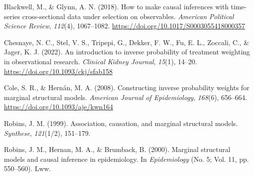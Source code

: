 \documentclass[
  letterpaper,
  DIV=11,
  numbers=noendperiod]{scrartcl}
\newlength{\cslhangindent}
\newenvironment{CSLReferences}[2] %
 {\begin{list}{}{%
  \setlength{\itemindent}{0pt}
  \setlength{\leftmargin}{0pt}
  \setlength{\parsep}{0pt}
  \ifodd #1
   \setlength{\leftmargin}{\cslhangindent}
   \setlength{\itemindent}{-1\cslhangindent}
  \fi
  \setlength{\itemsep}{#2\baselineskip}}}
 {\end{list}}
\begin{document}
\protect{}\label{refs}
\begin{CSLReferences}{1}{0}
Blackwell, M., \& Glynn, A. N. (2018). How to make causal inferences
with time-series cross-sectional data under selection on observables.
\emph{American Political Science Review}, \emph{112}(4), 1067--1082.
\href{https://doi.org/10.1017/S0003055418000357\%20}{https://doi.org/10.1017/S0003055418000357
}

Chesnaye, N. C., Stel, V. S., Tripepi, G., Dekker, F. W., Fu, E. L.,
Zoccali, C., \& Jager, K. J. (2022). An introduction to inverse
probability of treatment weighting in observational research.
\emph{Clinical Kidney Journal}, \emph{15}(1), 14--20.
\url{https://doi.org/10.1093/ckj/sfab158}

Cole, S. R., \& Hernán, M. A. (2008). Constructing inverse probability
weights for marginal structural models. \emph{American Journal of
Epidemiology}, \emph{168}(6), 656--664.
\url{https://doi.org/10.1093/aje/kwn164}

Robins, J. M. (1999). Association, causation, and marginal structural
models. \emph{Synthese}, \emph{121}(1/2), 151--179.

Robins, J. M., Hernan, M. A., \& Brumback, B. (2000). Marginal
structural models and causal inference in epidemiology. In
\emph{Epidemiology} (No. 5; Vol. 11, pp. 550--560). Lww.

\end{CSLReferences}
\end{document}
